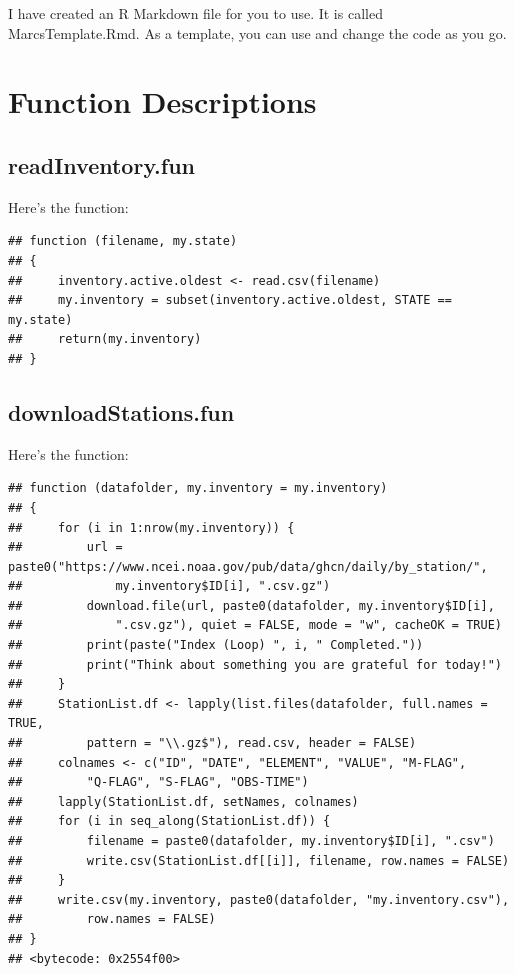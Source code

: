 \documentclass{article}\usepackage[]{graphicx}\usepackage[dvipsnames]{xcolor}
\makeatletter
\newenvironment{kframe}{%
 \def\at@end@of@kframe{}%
 \ifinner\ifhmode%
  \def\at@end@of@kframe{\end{minipage}}%
  \begin{minipage}{\columnwidth}%
 \fi\fi%
 \def\FrameCommand##1{\hskip\@totalleftmargin \hskip-\fboxsep
 \colorbox{shadecolor}{##1}\hskip-\fboxsep
     \hskip-\linewidth \hskip-\@totalleftmargin \hskip\columnwidth}%
 \MakeFramed {\advance\hsize-\width
   \@totalleftmargin\z@ \linewidth\hsize
   \@setminipage}}%
 {\par\unskip\endMakeFramed%
 \at@end@of@kframe}
\newenvironment{knitrout}{}{} %
\makeatother
\begin{document}
I have created an R Markdown file for you to use. It is called MarcsTemplate.Rmd. As a template, you can use and change the code as you go. 

\section{Function Descriptions}

\subsection{readInventory.fun}\label{subsec:readInventory}

Here's the function:

\begin{knitrout}
\color{fgcolor}\begin{kframe}
\begin{verbatim}
## function (filename, my.state) 
## {
##     inventory.active.oldest <- read.csv(filename)
##     my.inventory = subset(inventory.active.oldest, STATE == my.state)
##     return(my.inventory)
## }
\end{verbatim}
\end{kframe}
\end{knitrout}

\subsection{downloadStations.fun}\label{subsec:downloadStations}

Here's the function:

\begin{knitrout}
\color{fgcolor}\begin{kframe}
\begin{verbatim}
## function (datafolder, my.inventory = my.inventory) 
## {
##     for (i in 1:nrow(my.inventory)) {
##         url = paste0("https://www.ncei.noaa.gov/pub/data/ghcn/daily/by_station/", 
##             my.inventory$ID[i], ".csv.gz")
##         download.file(url, paste0(datafolder, my.inventory$ID[i], 
##             ".csv.gz"), quiet = FALSE, mode = "w", cacheOK = TRUE)
##         print(paste("Index (Loop) ", i, " Completed."))
##         print("Think about something you are grateful for today!")
##     }
##     StationList.df <- lapply(list.files(datafolder, full.names = TRUE, 
##         pattern = "\\.gz$"), read.csv, header = FALSE)
##     colnames <- c("ID", "DATE", "ELEMENT", "VALUE", "M-FLAG", 
##         "Q-FLAG", "S-FLAG", "OBS-TIME")
##     lapply(StationList.df, setNames, colnames)
##     for (i in seq_along(StationList.df)) {
##         filename = paste0(datafolder, my.inventory$ID[i], ".csv")
##         write.csv(StationList.df[[i]], filename, row.names = FALSE)
##     }
##     write.csv(my.inventory, paste0(datafolder, "my.inventory.csv"), 
##         row.names = FALSE)
## }
## <bytecode: 0x2554f00>
\end{verbatim}
\end{kframe}
\end{knitrout}
\end{document}
